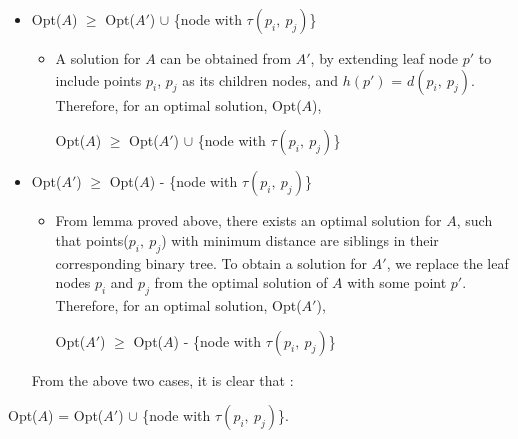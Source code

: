 \documentclass[pdftex,a4paper,12pt]{report}
\begin{document}
	\begin{itemize}
		\item Opt(\textbf{$A$}) $\geq$ Opt(\textbf{$A'$}) $\cup$ \{node with $\tau(p_i,\ p_j)$\}
		\begin{itemize}
			\item
			A solution for $A$ can be obtained from $A'$, by extending leaf node $p'$ to include 
			points $p_i$, $p_j$ as its children nodes, and $h(p')$ = $d(p_i,\ p_j)$. Therefore,
			for an optimal solution, Opt($A$),\\
			\begin{center}
				Opt(\textbf{$A$}) $\geq$ Opt(\textbf{$A'$}) $\cup$ \{node with $\tau(p_i,\ p_j)$\}
			\end{center}
		\end{itemize}

		\item Opt(\textbf{$A'$}) $\geq$ Opt(\textbf{$A$}) - \{node with $\tau(p_i,\ p_j)$\}
		\begin{itemize}
			\item
			From lemma proved above, there exists an optimal solution for $A$, such that 
			points($p_i,\ p_j$) with minimum distance are siblings in their corresponding binary tree.
			To obtain a solution for $A'$, we replace the leaf nodes $p_i$ and $p_j$ from the optimal
			solution of $A$ with some point $p'$. Therefore, for an optimal solution, Opt($A'$),
			\begin{center}
				Opt(\textbf{$A'$}) $\geq$ Opt(\textbf{$A$}) - \{node with $\tau(p_i,\ p_j)$\}
			\end{center}
		\end{itemize}
		
		From the above two cases, it is clear that :
	\end{itemize}
	\begin{center}
		Opt(\textbf{$A$}) = Opt(\textbf{$A'$}) $\cup$ \{node with $\tau(p_i,\ p_j)$\}.
	\end{center}
\end{document}

